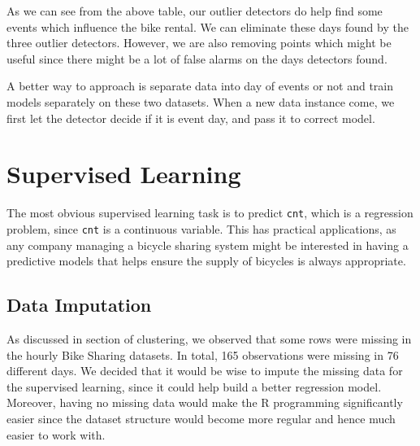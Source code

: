 \documentclass[12pt]{article}
\begin{document}
 	As we can see from the above table, our outlier detectors do help find some events which influence the bike rental. We can eliminate these days found by the three outlier detectors. However, we are also removing points which might be useful since there might be a lot of false alarms on the days detectors found.  
 	
 	A better way to approach is separate data into day of events or not and train models separately on these two datasets. When a new data instance come, we first let the detector decide if it is event day, and pass it to correct model.
	

\section{Supervised Learning}
\label{supervised learning}

The most obvious supervised learning task is to predict \texttt{cnt}, which is a regression problem, since \texttt{cnt} is a continuous variable. This has practical applications, as any company managing a bicycle sharing system might be interested in having a predictive models that helps ensure the supply of bicycles is always appropriate.

\subsection{Data Imputation}
\label{sec:imputation}
As discussed in section of clustering, we observed that some rows were missing in the hourly Bike Sharing datasets. In total, 165 observations were missing in 76 different days. We decided that it would be wise to impute the missing data for the supervised learning, since it could help build a better regression model. Moreover, having no missing data would make the R programming significantly easier since the dataset structure would become more regular and hence much easier to work with.
\end{document}

